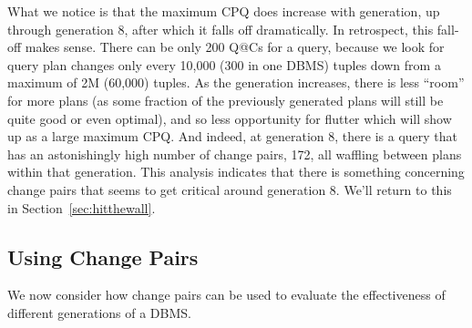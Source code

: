 \documentclass[prodmode,acmtods]{acmsmall}
\begin{document}
\begin{table}[h]
\end{table}

What we notice is that the maximum CPQ does increase with generation,
up through generation 8, after which it falls off dramatically. In
retrospect, this fall-off makes sense. There can be only 200 Q@Cs for a
query, because we look for query plan changes only every 10,000 (300 in one
DBMS) tuples down from
a maximum of 2M (60,000) tuples. As the generation increases, there is less ``room''
for more plans (as some fraction of the previously generated plans will
still be quite good or even optimal), and so less opportunity for flutter
which will show up as a large maximum CPQ. And indeed, at generation 8,
there is a query that has an astonishingly high number of change pairs,
172, all waffling between plans within that generation.
This analysis indicates that there is something concerning change pairs that seems to get
critical around generation 8. We'll return to this in Section~\ref{sec:hitthewall}.

\subsection{Using Change Pairs}\label{sec:usingCP}
We now consider how change pairs can be used to evaluate the
effectiveness of different generations of a \hbox{DBMS}.
\end{document}
